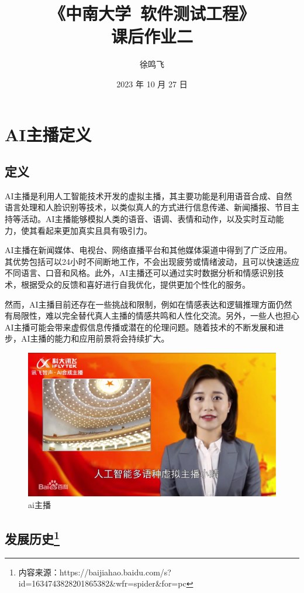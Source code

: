 \documentclass[11pt, a4paper, oneside]{ctexbook}
\title{{\Huge{\textbf{《中南大学\ 软件测试工程》}}}\\课后作业二}
\author{徐鸣飞}
\date{2023 年 10 月 27 日}
\begin{document}
\maketitle
{}
\setcounter{page}{1}
\newpage
{}
\setcounter{page}{1}
\tableofcontents
\newpage
\setcounter{page}{1}

\chapter{AI主播定义}
\section{定义}
AI主播是利用人工智能技术开发的虚拟主播，其主要功能是利用语音合成、自然语言处理和人脸识别等技术，以类似真人的方式进行信息传递、新闻播报、节目主持等活动。AI主播能够模拟人类的语音、语调、表情和动作，以及实时互动能力，使其看起来更加真实且具有吸引力。

AI主播在新闻媒体、电视台、网络直播平台和其他媒体渠道中得到了广泛应用。其优势包括可以24小时不间断地工作，不会出现疲劳或情绪波动，且可以快速适应不同语言、口音和风格。此外，AI主播还可以通过实时数据分析和情感识别技术，根据受众的反馈和喜好进行自我优化，提供更加个性化的服务。

然而，AI主播目前还存在一些挑战和限制，例如在情感表达和逻辑推理方面仍然有局限性，难以完全替代真人主播的情感共鸣和人性化交流。另外，一些人也担心AI主播可能会带来虚假信息传播或潜在的伦理问题。随着技术的不断发展和进步，AI主播的能力和应用前景将会持续扩大。
\begin{figure}[H]
    \centering
    \includegraphics[scale=0.3]{ai主播.png}
    \caption{ai主播}
    \label{fig:example1}
\end{figure}
\section[发展历史]{发展历史\protect\footnote{内容来源：https://baijiahao.baidu.com/s?id=1634743828201865382\&wfr=spider\&for=pc}}
\end{document}
